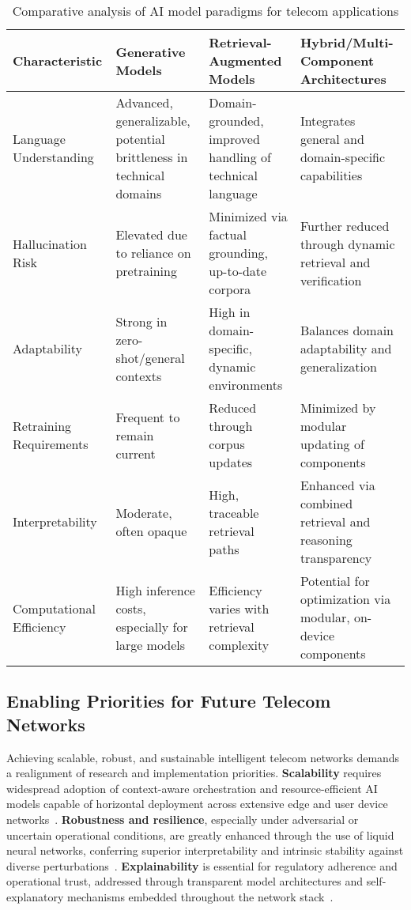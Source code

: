 \documentclass[sigconf]{acmart}
\begin{document}
\begin{table*}[htbp]
\centering
\caption{Comparative analysis of AI model paradigms for telecom applications}
\label{tab:model_comparison}
\begin{adjustbox}{max width=\textwidth}
\begin{tabular}{llll}
\toprule
\textbf{Characteristic} & \textbf{Generative Models} & \textbf{Retrieval-Augmented Models} & \textbf{Hybrid/Multi-Component Architectures} \\
\midrule
Language Understanding & Advanced, generalizable, potential brittleness in technical domains & Domain-grounded, improved handling of technical language & Integrates general and domain-specific capabilities \\
Hallucination Risk & Elevated due to reliance on pretraining & Minimized via factual grounding, up-to-date corpora & Further reduced through dynamic retrieval and verification \\
Adaptability & Strong in zero-shot/general contexts & High in domain-specific, dynamic environments & Balances domain adaptability and generalization \\
Retraining Requirements & Frequent to remain current & Reduced through corpus updates & Minimized by modular updating of components \\
Interpretability & Moderate, often opaque & High, traceable retrieval paths & Enhanced via combined retrieval and reasoning transparency \\
Computational Efficiency & High inference costs, especially for large models & Efficiency varies with retrieval complexity & Potential for optimization via modular, on-device components \\
\bottomrule
\end{tabular}
\end{adjustbox}
\end{table*}

\subsection{Enabling Priorities for Future Telecom Networks}

Achieving scalable, robust, and sustainable intelligent telecom networks demands a realignment of research and implementation priorities. \textbf{Scalability} requires widespread adoption of context-aware orchestration and resource-efficient AI models capable of horizontal deployment across extensive edge and user device networks~\cite{ref15,ref17,ref19}. \textbf{Robustness and resilience}, especially under adversarial or uncertain operational conditions, are greatly enhanced through the use of liquid neural networks, conferring superior interpretability and intrinsic stability against diverse perturbations~\cite{ref19}. \textbf{Explainability} is essential for regulatory adherence and operational trust, addressed through transparent model architectures and self-explanatory mechanisms embedded throughout the network stack~\cite{ref19,ref21,ref22,ref23}.
\end{document}
